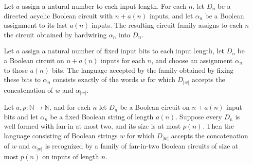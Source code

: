 \begin{definition}
\label{BoolCircuit.DAGCircuitFamily.hardwire}
\leanok
{}
Let $a$ assign a natural number to each input length. For each $n$, let $D_n$ be a
directed acyclic Boolean circuit with $n+a(n)$ inputs, and let $\alpha_n$ be a Boolean
assignment to its last $a(n)$ inputs. The resulting circuit family assigns to each $n$
the circuit obtained by hardwiring $\alpha_n$ into $D_n$.
\end{definition}

\begin{theorem}
\label{BoolCircuit.DAGCircuitFamily.hardwire_language}
\leanok
{}
Let $a$ assign a natural number of fixed input bits to each input length, let $D_n$ be a
Boolean circuit on $n+a(n)$ inputs for each $n$, and choose an assignment $\alpha_n$ to
those $a(n)$ bits. The language accepted by the family obtained by fixing these bits to
$\alpha_n$ consists exactly of the words $w$ for which $D_{|w|}$ accepts the
concatenation of $w$ and $\alpha_{|w|}$.
\end{theorem}

\begin{theorem}
\label{Language.InSIZE.of_hardwire}
\leanok
{}
Let $a,p : \mathbb{N} \to \mathbb{N}$, and for each $n$ let $D_n$ be a Boolean circuit
on $n+a(n)$ input bits and let $\alpha_n$ be a fixed Boolean string of length $a(n)$.
Suppose every $D_n$ is well formed with fan-in at most two, and its size is at most
$p(n)$. Then the language consisting of Boolean strings $w$ for which $D_{|w|}$ accepts
the concatenation of $w$ and $\alpha_{|w|}$ is recognized by a family of fan-in-two
Boolean circuits of size at most $p(n)$ on inputs of length $n$.
\end{theorem}

